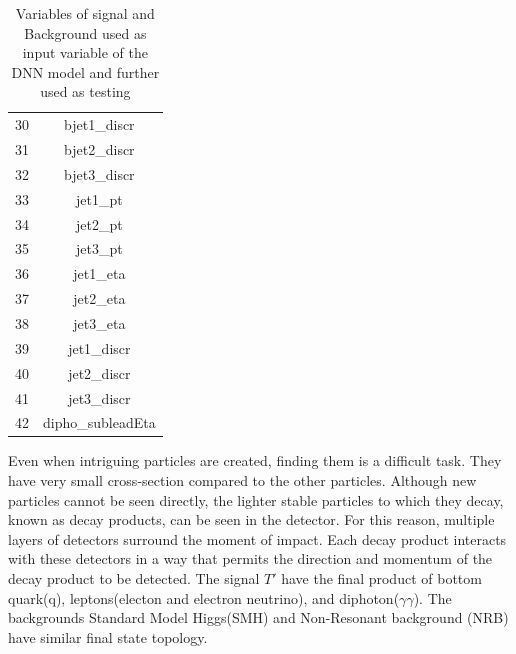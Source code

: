 \begin{table}[h!]
{\begin{tabular}{|c|c|}
                                  30  & bjet1\_discr\\
                                    31  & bjet2\_discr \\ 
                                    32 & bjet3\_discr \\
                                   33  &   jet1\_pt \\
                                    34  &  jet2\_pt  \\
                                   35    &  jet3\_pt  \\
                                  36      &  jet1\_eta  \\
                                 37        & jet2\_eta   \\
                                 38         &  jet3\_eta  \\
                                    39       &  jet1\_discr  \\
                                      40      &  jet2\_discr  \\
                                       41      &   jet3\_discr \\
                                       42       &  dipho\_subleadEta  \\
                                    
                                    
                                    
                                    \hline
           
    \end{tabular}}
    \caption{Variables of signal and Background used as input variable of the DNN model and further used as testing}
    \label{tab:my_label_Variable}
\end{table}





Even when intriguing particles are created, finding them is a difficult task. They have very small cross-section compared to the other particles. Although new particles cannot be seen directly, the lighter stable particles to which they decay, known as decay products, can be seen in the detector. For this reason, multiple layers of detectors surround the moment of impact. Each decay product interacts with these detectors in a way that permits the direction and momentum of the decay product to be detected. The signal $T{'}$ have the final product of bottom quark(q), leptons(electon and electron neutrino), and diphoton($\gamma\gamma$). The backgrounds Standard Model Higgs(SMH) and Non-Resonant background (NRB) have similar final state topology.

